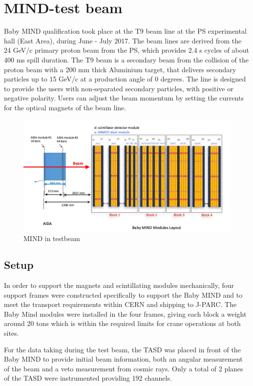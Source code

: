 \section{MIND-test beam}

Baby MIND qualification took place at the T9 beam line at the PS experimental hall (East Area), during June - July 2017. The beam lines are derived from the 24 GeV/c primary proton beam from the PS, which provides 2.4 s cycles of about 400 ms spill duration. The T9 beam is a secondary beam from the collision of the proton beam with a 200 mm thick Aluminium target, that delivers secondary particles up to 15 GeV/c at a production angle of 0 degrees. The line is designed to provide the users with non-separated secondary particles, with positive or negative polarity. Users can adjust the beam momentum by setting the currents for the optical magnets of the beam line.

\begin{figure}[h!]
\centering
\includegraphics[width=\textwidth]{figures/MINDAIDAtestbeam.jpeg}
\caption{MIND in testbeam}
\label{fig:MINDtb}
\end{figure}

\subsection{Setup}

In order to support the magnets and scintillating modules mechanically, four support frames were constructed specifically to support the Baby MIND and  to meet the transport requirements within CERN and shipping to J-PARC. The Baby Mind modules were installed in the four frames, giving each block a weight around 20 tons which is within the required limits for crane operations at both sites.

For the data taking during the test beam, the TASD was placed in front of the Baby MIND to provide initial beam information, both an angular measurement of the beam and a veto measurement from cosmic rays. Only a total of 2 planes of the TASD were instrumented providing 192 channels. 

